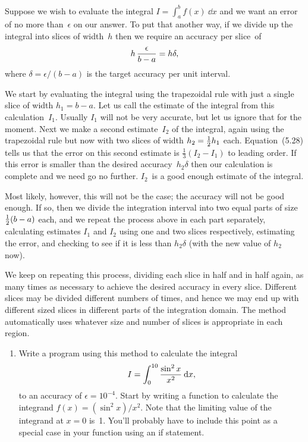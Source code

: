 \documentclass[12pt]{article}
\begin{document}
\begin{exercises}
  Suppose we wish to evaluate the integral $I = \int_a^b f(x) \>\dd x$ and
  we want an error of no more than~$\epsilon$ on our answer.  To put that
  another way, if we divide up the integral into slices of width~$h$ then
  we require an accuracy per slice~of
\begin{displaymath}
h\,{\epsilon\over b-a} = h\delta,
\end{displaymath}
where $\delta = \epsilon/(b-a)$ is the target accuracy per unit interval.

We start by evaluating the integral using the trapezoidal rule with just a
single slice of width $h_1=b-a$.  Let us call the estimate of the integral
from this calculation~$I_1$.  Usually $I_1$ will not be very accurate, but
let us ignore that for the moment.  Next we make a second estimate~$I_2$ of
the integral, again using the trapezoidal rule but now with two slices of
width $h_2=\tfrac12 h_1$ each.  Equation~(5.28) tells us that the error on
this second estimate is $\frac13(I_2-I_1)$ to leading order.  If this error
is smaller than the desired accuracy~$h_2\delta$ then our calculation is
complete and we need go no further.  $I_2$~is a good enough estimate of the
integral.

Most likely, however, this will not be the case; the accuracy will not be
good enough.  If so, then we divide the integration interval into two equal
parts of size $\tfrac12 (b-a)$ each, and we repeat the process above in each
part separately, calculating estimates $I_1$ and $I_2$ using one and two
slices respectively, estimating the error, and checking to see if it is
less than $h_2\delta$ (with the new value of $h_2$ now).

We keep on repeating this process, dividing each slice in half and in half
again, as many times as necessary to achieve the desired accuracy in every
slice.  Different slices may be divided different numbers of times, and
hence we may end up with different sized slices in different parts of the
integration domain.  The method automatically uses whatever size and number
of slices is appropriate in each region.
\begin{enumerate}\setlength{\itemsep}{0pt}
\item Write a program using this method to calculate the integral
\begin{displaymath}
I = \int_0^{10} {\sin^2 x\over x^2} \>\mathrm{d} x,
\end{displaymath}
to an accuracy of $\epsilon=10^{-4}$.  Start by writing a function to
calculate the integrand $f(x) = (\sin^2 x)/x^2$.  Note that the limiting
value of the integrand at $x=0$ is~1.  You'll probably have to include this
point as a special case in your function using an if statement.


\end{enumerate}
\end{exercises}
\end{document}
